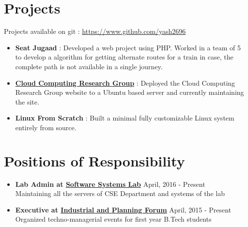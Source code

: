 \documentclass[margin, centered]{res}
\begin{document}
\begin{resume}
\section{Projects}
Projects available on git : \url{https://www.github.com/yash2696}
\begin{itemize}[leftmargin=*]
\item \textbf{Seat Jugaad} : Developed a web project using PHP. Worked in a team of 5 to develop a algorithm for getting alternate routes for a train in case, the complete path is not available in a single journey.
\item \textbf{\href{https://ccrg.cse.nitc.ac.in}{Cloud Computing Research Group}} : Deployed the Cloud Computing Research Group website to a Ubuntu based server and currently maintaining the site.
\item \textbf{{Linux From Scratch}} : Built a minimal fully customizable Linux system entirely from source.
\end{itemize}

\section{Positions of \hspace{2mm} Responsibility}
\begin{itemize}[leftmargin=*]
\item\textbf{Lab Admin at \href{http://athena.nitc.ac.in}{Software Systems Lab}} \hfill April, 2016 - Present\\
Maintaining all the servers of CSE Department and systems of the lab
\item\textbf{Executive at \href{https://www.facebook.com/ipfnitc}{Industrial and Planning Forum}} \hfill April, 2015 - Present\\
Organized techno-managerial events for first year B.Tech students
\end{itemize}


\end{resume}
\end{document}
